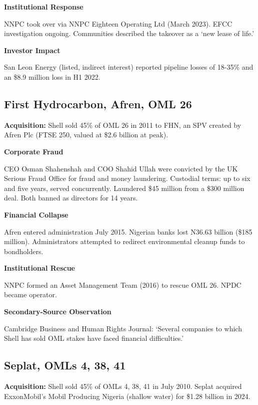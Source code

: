 \textbf{Institutional Response}

NNPC took over via NNPC Eighteen Operating Ltd (March 2023). EFCC
investigation ongoing. Communities described the takeover as a `new
lease of life.'

\textbf{Investor Impact}

San Leon Energy (listed, indirect interest) reported pipeline losses of
18-35\% and an \$8.9 million loss in H1 2022.

\hypertarget{first-hydrocarbon-afren-oml-26}{%
\subsection{First Hydrocarbon, Afren, OML
26}\label{first-hydrocarbon-afren-oml-26}}

\textbf{Acquisition:} Shell sold 45\% of OML 26 in 2011 to FHN, an SPV
created by Afren Plc (FTSE 250, valued at \$2.6 billion at peak).

\textbf{Corporate Fraud}

CEO Osman Shahenshah and COO Shahid Ullah were convicted by the UK
Serious Fraud Office for fraud and money laundering. Custodial terms: up
to six and five years, served concurrently. Laundered \$45 million from
a \$300 million deal. Both banned as directors for 14 years.

\textbf{Financial Collapse}

Afren entered administration July 2015. Nigerian banks lost N36.63
billion (\$185 million). Administrators attempted to redirect
environmental cleanup funds to bondholders.

\textbf{Institutional Rescue}

NNPC formed an Asset Management Team (2016) to rescue OML 26. NPDC
became operator.

\textbf{Secondary-Source Observation}

Cambridge Business and Human Rights Journal: `Several companies to which
Shell has sold OML stakes have faced financial difficulties.'

\hypertarget{seplat-omls-4-38-41}{%
\subsection{Seplat, OMLs 4, 38, 41}\label{seplat-omls-4-38-41}}

\textbf{Acquisition:} Shell sold 45\% of OMLs 4, 38, 41 in July 2010.
Seplat acquired ExxonMobil's Mobil Producing Nigeria (shallow water) for
\$1.28 billion in 2024.

